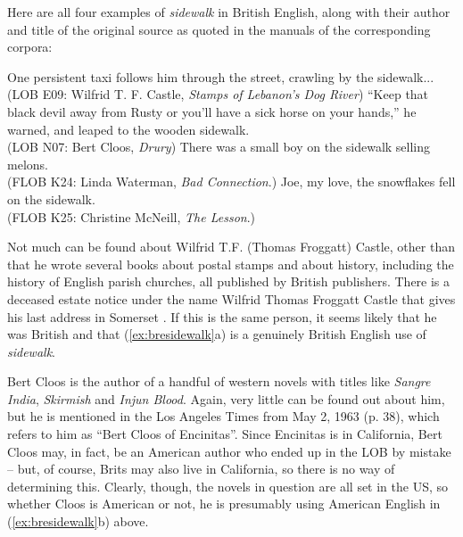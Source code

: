 Here are all four examples of \textit{sidewalk} in British English, along with their author and title of the original source as quoted in the manuals of the corresponding corpora:

\begin{exe}
\ex
\begin{xlist} 
\label{ex:bresidewalk}
\ex One persistent taxi follows him through the street, crawling by the sidewalk... \\
(LOB E09: Wilfrid T. F. Castle, \textit{Stamps of Lebanon's Dog River})
\ex ``Keep that black devil away from Rusty or you'll have a sick horse on your hands,'' he warned, and leaped to the wooden sidewalk. \\
(LOB N07: Bert Cloos, \textit{Drury})
\ex There was a small boy on the sidewalk selling melons. \\
(FLOB K24: Linda Waterman, \textit{Bad Connection}.)
\ex Joe, my love, the snowflakes fell on the sidewalk. \\
(FLOB K25: Christine McNeill, \textit{The Lesson}.)
\end{xlist}
\end{exe}

Not much can be found about Wilfrid T.F. (Thomas Froggatt) Castle, other than that he wrote several books about postal stamps and about history, including the history of English parish churches, all published by British publishers. There is a deceased estate notice under the name Wilfrid Thomas Froggatt Castle that gives his last address in Somerset \citep{the_stationery_office_deceased_1999}. If this is the same person, it seems likely that he was British and that (\ref{ex:bresidewalk}a) is a genuinely British English use of \textit{sidewalk}. 

Bert Cloos is the author of a handful of western novels with titles like \textit{Sangre India}, \textit{Skirmish} and \textit{Injun Blood}. Again, very little can be found out about him, but he is mentioned in the Los Angeles Times from May 2, 1963 (p. 38), which refers to him as ``Bert Cloos of Encinitas''. Since Encinitas is in California, Bert Cloos may, in fact, be an American author who ended up in the LOB by mistake -- but, of course, Brits may also live in California, so there is no way of determining this. Clearly, though, the novels in question are all set in the US, so whether Cloos is American or not, he is presumably using American English in (\ref{ex:bresidewalk}b) above.

